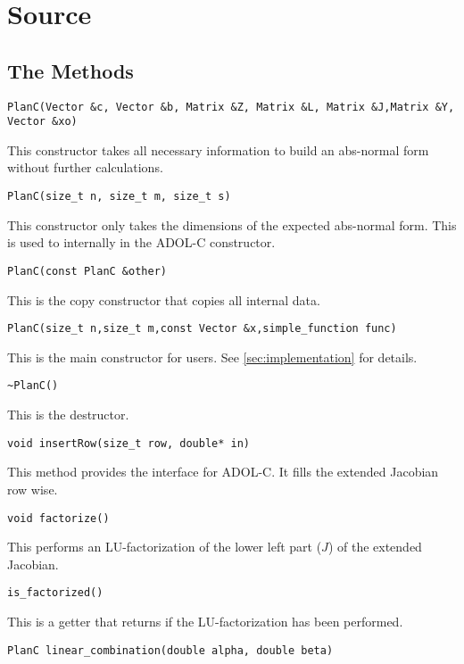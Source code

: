 \chapter{Source}\label{sec:source}
\section[Public Methods]{The \texorpdfstring{}{Public} Methods}
\lstset{
		aboveskip=0pt,
		belowskip=0pt,
		columns=flexible,
	}
\begin{lstlisting}[numbers=none]
PlanC(Vector &c, Vector &b, Matrix &Z, Matrix &L, Matrix &J,Matrix &Y, Vector &xo)
\end{lstlisting}
This constructor takes all necessary information to build an abs-normal form without further calculations.
\begin{lstlisting}[numbers=none]
PlanC(size_t n, size_t m, size_t s)
\end{lstlisting}
This constructor only takes the dimensions of the expected abs-normal form. This is used to internally in the ADOL-C constructor.
\begin{lstlisting}[numbers=none]
PlanC(const PlanC &other)
\end{lstlisting}
This is the copy constructor that copies all internal data.
\begin{lstlisting}[numbers=none]
PlanC(size_t n,size_t m,const Vector &x,simple_function func)
\end{lstlisting}
This is the main constructor for users. See \ref{sec:implementation} for details.
\begin{lstlisting}[numbers=none]
~PlanC()
\end{lstlisting}
This is the destructor.
\begin{lstlisting}[numbers=none]
void insertRow(size_t row, double* in)
\end{lstlisting}
This method provides the interface for ADOL-C. It fills the extended Jacobian  row wise. 
\begin{lstlisting}[numbers=none]
void factorize()
\end{lstlisting}
This performs an LU-factorization of the lower left part ($J$) of the extended Jacobian.
\clearpage
\begin{lstlisting}[numbers=none]
is_factorized()
\end{lstlisting}
This is a getter that returns if the LU-factorization has been performed.
\begin{lstlisting}[numbers=none]
PlanC linear_combination(double alpha, double beta)
\end{lstlisting}
